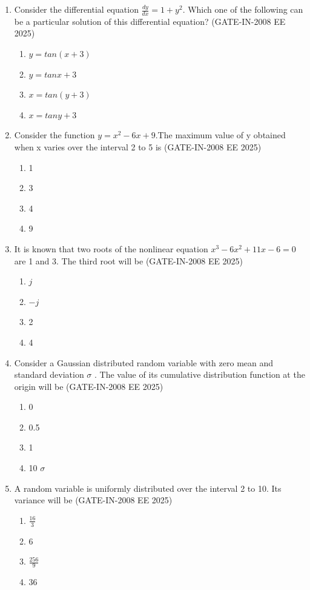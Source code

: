 \documentclass[journal,12pt,onecolumn]{IEEEtran}
\theoremstyle{remark}
\begin{document}
\begin{enumerate}[label=Q.\arabic*,start=1]
    \item Consider the differential equation $\frac{dy}{dx}=1 + y^2$. Which one of the following can be a particular solution of this differential equation? (GATE-IN-2008 EE 2025)
    \begin{enumerate} 
        \item $y=tan(x+3)$
        \item $y=tanx + 3$ 
        \item $x=tan(y+3)$ 
        \item $x=tany + 3$
    \end{enumerate}
    
    \item  Consider the function $y=x^2 -6x +9$.The maximum value of y obtained when x varies over the interval 2 to 5 is (GATE-IN-2008 EE 2025)
    \begin{enumerate} 
        \item 1
        \item 3 
        \item 4 
        \item 9
    \end{enumerate}
    
    \item It is known that two roots of the nonlinear equation $x^3 -6x^2 +11x -6 = 0$ are 1 and 3. The third root will be (GATE-IN-2008 EE 2025)
    \begin{enumerate} 
        \item $j$ 
        \item $-j$
        \item 2
        \item 4
    \end{enumerate}
    
    \item Consider a Gaussian distributed random variable with zero mean and standard deviation $\sigma$ . The
value of its cumulative distribution function at the origin will be (GATE-IN-2008 EE 2025)
    \begin{enumerate} 
        \item 0
        \item 0.5
        \item 1
        \item 10 $\sigma$
    \end{enumerate}
    
    \item  A random variable is uniformly distributed over the interval 2 to 10. Its variance will be (GATE-IN-2008 EE 2025)
    \begin{enumerate} 
        \item \(\frac{16}{3}\) 
        \item 6
        \item \(\frac{256}{9}\)
        \item 36
    \end{enumerate}
    

\end{enumerate}
\end{document}
